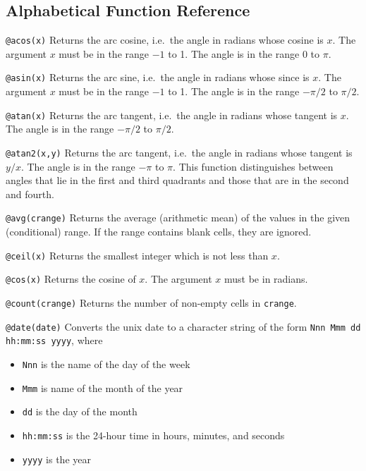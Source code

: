 \documentclass[titlepage]{article}
\begin{document}
\subsection{Alphabetical Function Reference}

\newcommand{\fnstart}[1]{%
  \vspace{1ex}\noindent\texttt{#1} }

\fnstart{@acos(x)} Returns the arc cosine, i.e.\ the
angle in radians whose cosine is $x$.  The argument $x$ must be in the
range $-1$ to 1.  The angle is in the range 0 to $\pi$.

\fnstart{@asin(x)} Returns the arc sine, i.e.\ the angle
in radians whose since is $x$.  The argument $x$ must be in the range
$-1$ to 1.  The angle is in the range $-\pi/2$ to $\pi/2$.

\fnstart{@atan(x)} Returns the arc tangent, i.e.\ the
angle in radians whose tangent is $x$.  The angle is in the range
$-\pi/2$ to $\pi/2$.

\fnstart{@atan2(x,y)} Returns the arc tangent, i.e.\ the
angle in radians whose tangent is $y/x$.  The angle is in the range
$-\pi$ to $\pi$.  This function distinguishes between angles that lie
in the first and third quadrants and those that are in the second and
fourth.

\fnstart{@avg(crange)} Returns the average (arithmetic mean) of the
values in the given (conditional) range.  If the range contains blank
cells, they are ignored.

\fnstart{@ceil(x)} Returns the smallest integer which is not less than
$x$.

\fnstart{@cos(x)} Returns the cosine of $x$.  The argument $x$ must be
in radians.

\fnstart{@count(crange)} Returns the number of non-empty cells in
 \texttt{crange}.
 
 \fnstart{@date(date)} Converts the unix date to a character string of
 the form \texttt{Nnn Mmm dd hh:mm:ss yyyy}, where

\begin{itemize}\itemsep -2pt
    \item[] \texttt{Nnn} is the name of the day of the week
    \item[] \texttt{Mmm} is name of the month of the year
    \item[] \texttt{dd} is the day of the month
    \item[] \texttt{hh:mm:ss} is the 24-hour time in hours, 
      minutes, and seconds
    \item[] \texttt{yyyy} is the year
\end{itemize}
\end{document}
